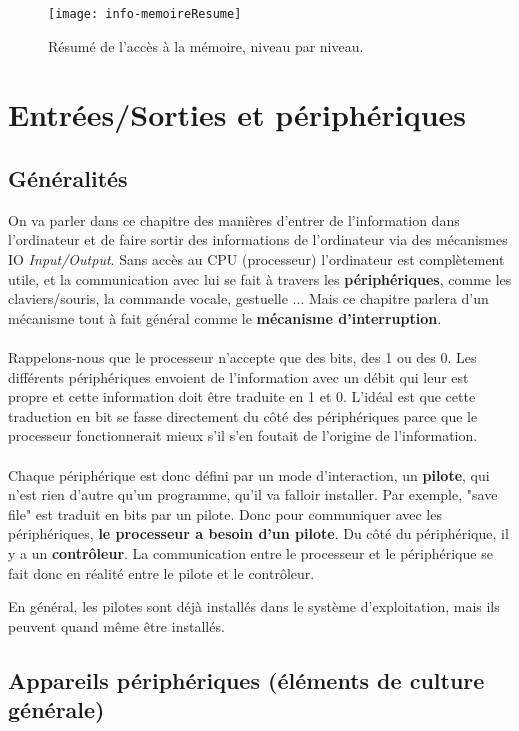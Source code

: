 \documentclass[12pt,a4paper]{report}
\begin{document}
\begin{figure}[h!]
\centering
\texttt{[image: info-memoireResume]}
\caption{Résumé de l'accès à la mémoire, niveau par niveau.}
\label{fig:memoireResume}
\end{figure}
\chapter{Entrées/Sorties et périphériques}\label{chapter:peripheriques}
\section{Généralités}
On va parler dans ce chapitre des manières d'entrer de l'information dans l'ordinateur et de faire sortir des informations de l'ordinateur via des mécanismes IO \textit{Input/Output}. Sans accès au CPU (processeur) l'ordinateur est complètement utile, et la communication avec lui se fait à travers les \textbf{périphériques}, comme les claviers/souris, la commande vocale, gestuelle ... Mais ce chapitre parlera d'un mécanisme tout à fait général comme le \textbf{mécanisme d'interruption}.\\
\\
Rappelons-nous que le processeur n'accepte que des bits, des 1 ou des 0. Les différents périphériques envoient de l'information avec un débit qui leur est propre et cette information doit être traduite en 1 et 0. L'idéal est que cette traduction en bit se fasse directement du côté des périphériques parce que le processeur fonctionnerait mieux s'il s'en foutait de l'origine de l'information. \\
\\
Chaque périphérique est donc défini par un mode d'interaction, un \textbf{pilote}, qui n'est rien d'autre qu'un programme, qu'il va falloir installer. Par exemple, "save file" est traduit en bits par un pilote. Donc pour communiquer avec les périphériques, \textbf{le processeur a besoin d'un pilote}. Du côté du périphérique, il y a un \textbf{contrôleur}. La communication entre le processeur et le périphérique se fait donc en réalité entre le pilote et le contrôleur. 


En général, les pilotes sont déjà installés dans le système d'exploitation, mais ils peuvent quand même être installés.
\section{Appareils périphériques (éléments de culture générale)}
\end{document}
